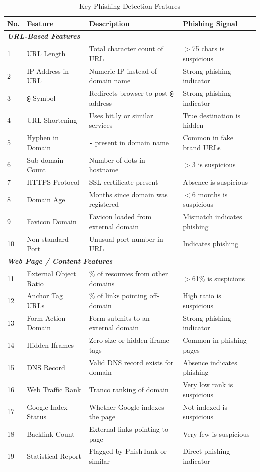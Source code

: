 \documentclass[11pt,letterpaper]{article}
\begin{document}
\begin{table}[h!]
\centering
\caption{Key Phishing Detection Features}
\label{tab:features}
\begin{tabular}{p{0.5cm} p{3.5cm} p{3.9cm} p{3.8cm}}
\toprule
\textbf{No.} & \textbf{Feature} & \textbf{Description} & \textbf{Phishing Signal} \\
\midrule
\multicolumn{4}{l}{\textit{\textbf{URL-Based Features}}} \\
\midrule
1  & URL Length            & Total character count of URL        & $>$75 chars is suspicious \\
2  & IP Address in URL     & Numeric IP instead of domain name   & Strong phishing indicator \\
3  & \texttt{@} Symbol     & Redirects browser to post-\texttt{@} address & Strong phishing indicator \\
4  & URL Shortening        & Uses bit.ly or similar services     & True destination is hidden \\
5  & Hyphen in Domain      & \texttt{-} present in domain name   & Common in fake brand URLs \\
6  & Sub-domain Count      & Number of dots in hostname          & $>$3 is suspicious \\
7  & HTTPS Protocol        & SSL certificate present             & Absence is suspicious \\
8  & Domain Age            & Months since domain was registered  & $<$6 months is suspicious \\
9  & Favicon Domain        & Favicon loaded from external domain & Mismatch indicates phishing \\
10 & Non-standard Port     & Unusual port number in URL          & Indicates phishing \\
\midrule
\multicolumn{4}{l}{\textit{\textbf{Web Page / Content Features}}} \\
\midrule
11 & External Object Ratio & \% of resources from other domains  & $>$61\% is suspicious \\
12 & Anchor Tag URLs       & \% of links pointing off-domain     & High ratio is suspicious \\
13 & Form Action Domain    & Form submits to an external domain  & Strong phishing indicator \\
14 & Hidden Iframes        & Zero-size or hidden iframe tags     & Common in phishing pages \\
15 & DNS Record            & Valid DNS record exists for domain  & Absence indicates phishing \\
16 & Web Traffic Rank      & Tranco ranking of domain            & Very low rank is suspicious \\
17 & Google Index Status   & Whether Google indexes the page     & Not indexed is suspicious \\
18 & Backlink Count        & External links pointing to page     & Very few is suspicious \\
19 & Statistical Report    & Flagged by PhishTank or similar     & Direct phishing indicator \\
\bottomrule
\end{tabular}
\end{table}
\FloatBarrier
\end{document}
